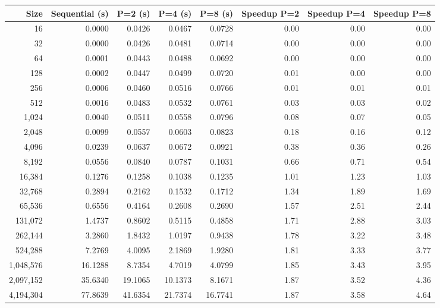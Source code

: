 \begin{tabular}{r|r|rrrrrr}
\hline
Size & Sequential (s) & P=2 (s) & P=4 (s) & P=8 (s) & Speedup P=2 & Speedup P=4 & Speedup P=8 \\
\hline
16 & 0.0000 & 0.0426 & 0.0467 & 0.0728 & 0.00 & 0.00 & 0.00 \\
32 & 0.0000 & 0.0426 & 0.0481 & 0.0714 & 0.00 & 0.00 & 0.00 \\
64 & 0.0001 & 0.0443 & 0.0488 & 0.0692 & 0.00 & 0.00 & 0.00 \\
128 & 0.0002 & 0.0447 & 0.0499 & 0.0720 & 0.01 & 0.00 & 0.00 \\
256 & 0.0006 & 0.0460 & 0.0516 & 0.0766 & 0.01 & 0.01 & 0.01 \\
512 & 0.0016 & 0.0483 & 0.0532 & 0.0761 & 0.03 & 0.03 & 0.02 \\
1,024 & 0.0040 & 0.0511 & 0.0558 & 0.0796 & 0.08 & 0.07 & 0.05 \\
2,048 & 0.0099 & 0.0557 & 0.0603 & 0.0823 & 0.18 & 0.16 & 0.12 \\
4,096 & 0.0239 & 0.0637 & 0.0672 & 0.0921 & 0.38 & 0.36 & 0.26 \\
8,192 & 0.0556 & 0.0840 & 0.0787 & 0.1031 & 0.66 & 0.71 & 0.54 \\
16,384 & 0.1276 & 0.1258 & 0.1038 & 0.1235 & 1.01 & 1.23 & 1.03 \\
32,768 & 0.2894 & 0.2162 & 0.1532 & 0.1712 & 1.34 & 1.89 & 1.69 \\
65,536 & 0.6556 & 0.4164 & 0.2608 & 0.2690 & 1.57 & 2.51 & 2.44 \\
131,072 & 1.4737 & 0.8602 & 0.5115 & 0.4858 & 1.71 & 2.88 & 3.03 \\
262,144 & 3.2860 & 1.8432 & 1.0197 & 0.9438 & 1.78 & 3.22 & 3.48 \\
524,288 & 7.2769 & 4.0095 & 2.1869 & 1.9280 & 1.81 & 3.33 & 3.77 \\
1,048,576 & 16.1288 & 8.7354 & 4.7019 & 4.0799 & 1.85 & 3.43 & 3.95 \\
2,097,152 & 35.6340 & 19.1065 & 10.1373 & 8.1671 & 1.87 & 3.52 & 4.36 \\
4,194,304 & 77.8639 & 41.6354 & 21.7374 & 16.7741 & 1.87 & 3.58 & 4.64 \\
\hline
\end{tabular}